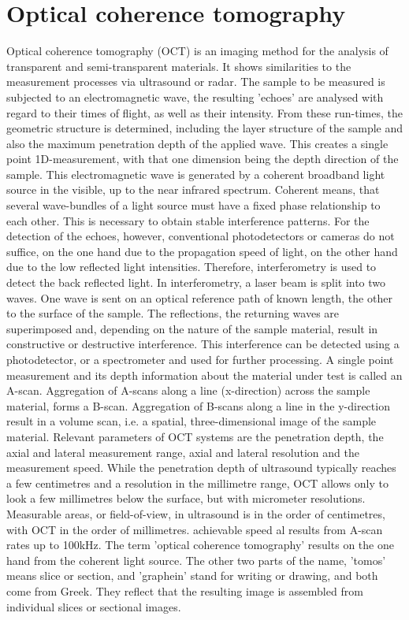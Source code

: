 \section{Optical coherence tomography}
Optical coherence tomography (OCT) is an imaging method for the analysis of transparent and semi-transparent materials. It shows similarities to the measurement processes via ultrasound or radar. The sample to be measured is subjected to an electromagnetic wave, the resulting 'echoes' are analysed with regard to their times of flight, as well as their intensity. From these run-times,  the geometric structure is determined, including the layer structure of the sample and also the maximum penetration depth of the applied wave. This creates a single point 1D-measurement, with that one dimension being the depth direction of the sample. This electromagnetic wave is generated by a coherent broadband light source in the visible, up to the near infrared spectrum. Coherent means, that several wave-bundles of a light source must have a fixed phase relationship to each other. This is necessary to obtain stable interference patterns. For the detection of the echoes, however, conventional photodetectors or cameras do not suffice, on the one hand due to the propagation speed of light, on the other hand due to the low reflected light intensities. Therefore, interferometry is used to detect the back reflected light. In interferometry, a laser beam is split into two waves. One wave is sent on an optical reference path of known length, the other to the surface of the sample. The reflections, the returning waves are superimposed and, depending on the nature of the sample material, result in constructive or destructive interference. This interference can be detected using a photodetector, or a spectrometer and used for further processing. A single point measurement and its depth information about the material under test is called an A-scan. Aggregation of A-scans along a line (x-direction) across the sample material, forms a B-scan. Aggregation of B-scans along a line in the y-direction result in a volume scan, i.e. a spatial, three-dimensional image of the sample material. Relevant parameters of OCT systems are the penetration depth, the axial and lateral measurement range, axial and lateral resolution and the measurement speed. While the penetration depth of ultrasound typically reaches a few centimetres and a resolution in the millimetre range, OCT allows only to look a few millimetres below the surface, but with micrometer resolutions. Measurable areas, or field-of-view, in ultrasound is in the order of centimetres, with OCT in the order of millimetres. achievable speed al results from A-scan rates up to 100kHz. The term 'optical coherence tomography' results on the one hand from the coherent light source. The other two parts of the name, 'tomos' means slice or section, and 'graphein' stand for writing or drawing, and both come from Greek. They reflect that the resulting image is assembled from individual slices or sectional images. 
